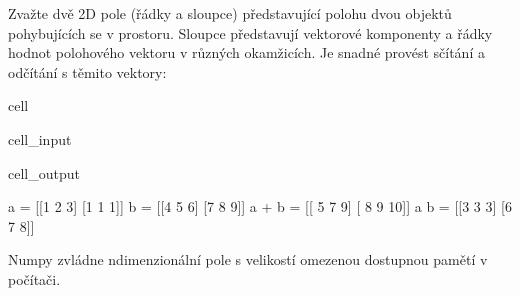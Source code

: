 \documentclass[letterpaper,10pt,english]{jupyterBook}
\begin{document}
\sphinxAtStartPar
Zvažte dvě 2D pole (řádky a sloupce) představující polohu dvou objektů pohybujících se v prostoru. Sloupce představují vektorové komponenty a řádky hodnot polohového vektoru v různých okamžicích. Je snadné provést sčítání a odčítání s těmito vektory:

\begin{sphinxuseclass}{cell}\begin{sphinxVerbatimInput}

\begin{sphinxuseclass}{cell_input}
\begin{sphinxVerbatim}[commandchars=\\\{\}]
  \PYG{p}{[}\PYG{p}{[}  \PYG{p}{]} \PYG{p}{[}  \PYG{p}{]}\PYG{p}{]}
  \PYG{p}{[}\PYG{p}{[}  \PYG{p}{]} \PYG{p}{[}  \PYG{p}{]}\PYG{p}{]}
   
   
   
\end{sphinxVerbatim}

\end{sphinxuseclass}\end{sphinxVerbatimInput}
\begin{sphinxVerbatimOutput}

\begin{sphinxuseclass}{cell_output}
\begin{sphinxVerbatim}[commandchars=\\\{\}]
a = [[1 2 3]
 [1 1 1]] 
b = [[4 5 6]
 [7 8 9]]
a + b = [[ 5  7  9]
 [ 8  9 10]]
a \PYGZhy{} b = [[\PYGZhy{}3 \PYGZhy{}3 \PYGZhy{}3]
 [\PYGZhy{}6 \PYGZhy{}7 \PYGZhy{}8]]
\end{sphinxVerbatim}

\end{sphinxuseclass}\end{sphinxVerbatimOutput}

\end{sphinxuseclass}
\sphinxAtStartPar
Numpy zvládne n\sphinxhyphen{}dimenzionální pole s velikostí omezenou dostupnou pamětí v počítači.
\end{document}
